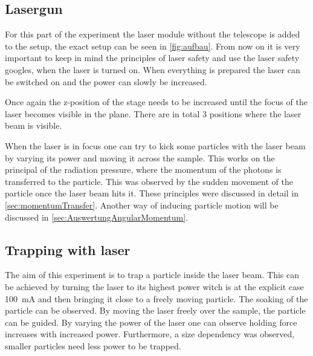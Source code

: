 \documentclass[12pt,english,ngerman]{scrartcl}
\begin{document}
\subsection{Lasergun}

For this part of the experiment the laser module without the telescope is added
to the setup, the exact setup can be seen in \autoref{fig:aufbau}. From now on
it is very important to keep in mind the principles of laser safety and use the
laser safety googles, when the laser is turned on. When everything is prepared
the laser can be switched on and the power can slowly be increased.

Once again the z-position of the stage needs to be increased until the focus of
the laser becomes visible in the plane. There are in total 3 positions where
the laser beam is visible.


When the laser is in focus one can try to kick some particles with the laser
beam by varying its power and moving it across the sample. This works on the
principal of the radiation pressure, where the momentum of the photons is
transferred to the particle. This was observed by the sudden movement of the
particle once the laser beam hits it. These principles were discussed in detail
in \autoref{sec:momentumTransfer}. Another way of inducing particle motion will
be discussed in \autoref{sec:AuswertungAngularMomentum}.

\subsection{Trapping with laser}

The aim of this experiment is to trap a particle inside the laser beam. This
can be achieved by turning the laser to its highest power witch is at the
explicit case \SI{100}{\milli\ampere} and then bringing it close to a freely
moving particle. The soaking of the particle can be observed. By moving the
laser freely over the sample, the particle can be guided. By varying the power
of the laser one can observe holding force increases with increased power.
Furthermore, a size dependency was observed, smaller particles need less power
to be trapped.
\end{document}
